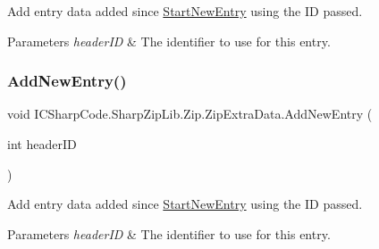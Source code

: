 Add entry data added since \hyperlink{class_i_c_sharp_code_1_1_sharp_zip_lib_1_1_zip_1_1_zip_extra_data_a3fd5ac216b1b6a0fe5ae92ea8156f20a}{Start\+New\+Entry} using the ID passed. 


\begin{DoxyParams}{Parameters}
{\em header\+ID} & The identifier to use for this entry.\\
\hline
\end{DoxyParams}
\mbox{\label{class_i_c_sharp_code_1_1_sharp_zip_lib_1_1_zip_1_1_zip_extra_data_aba673aeb5ed08038a5c76377c0607ca9}} 
\subsubsection{\texorpdfstring{Add\+New\+Entry()}{AddNewEntry()}\hspace{0.1cm}{\footnotesize\ttfamily [2/2]}}
{\footnotesize\ttfamily void I\+C\+Sharp\+Code.\+Sharp\+Zip\+Lib.\+Zip.\+Zip\+Extra\+Data.\+Add\+New\+Entry (\begin{DoxyParamCaption}\item[{int}]{header\+ID }\end{DoxyParamCaption})\hspace{0.3cm}{\ttfamily [inline]}}



Add entry data added since \hyperlink{class_i_c_sharp_code_1_1_sharp_zip_lib_1_1_zip_1_1_zip_extra_data_a3fd5ac216b1b6a0fe5ae92ea8156f20a}{Start\+New\+Entry} using the ID passed. 


\begin{DoxyParams}{Parameters}
{\em header\+ID} & The identifier to use for this entry.\\
\hline
\end{DoxyParams}
\mbox{\label{class_i_c_sharp_code_1_1_sharp_zip_lib_1_1_zip_1_1_zip_extra_data_a3ef708be128a41a9dafd3a6b8c372a94}} 

